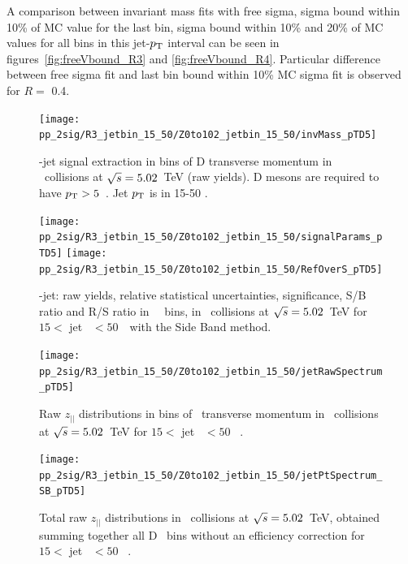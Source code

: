 A comparison between invariant mass fits with free sigma, sigma bound within 10\% of MC value for the last bin, 
sigma bound within 10\% and 20\% of MC values for all bins in this jet-$p_{\text T}$ interval can be seen in 
figures~\ref{fig:freeVbound_R3} and \ref{fig:freeVbound_R4}. Particular difference between free sigma fit and last bin bound within 10\% MC sigma fit is observed for $R=$ 0.4.

\begin{figure}[bth]
\centering
\begin{minipage}{.65\textwidth}
  \centering
  \texttt{[image: pp\_2sig/R3\_jetbin\_15\_50/Z0to102\_jetbin\_15\_50/invMass\_pTD5]}
\caption{\Dzero-jet signal extraction in bins of D transverse momentum in \pp\ collisions at $\sqrt{s}=5.02$~TeV (raw yields). D mesons are required to have $p_{\rm T}>5$~\GeVc. Jet $p_{\rm T}$ is in 15-50 \GeVc.
}
\label{fig:eq_pp_InvMass_Dzero_15_50_R3}
\end{minipage}%
\begin{minipage}{.4\textwidth}
  \centering
  \texttt{[image: pp\_2sig/R3\_jetbin\_15\_50/Z0to102\_jetbin\_15\_50/signalParams\_pTD5]}
  \texttt{[image: pp\_2sig/R3\_jetbin\_15\_50/Z0to102\_jetbin\_15\_50/RefOverS\_pTD5]}
\caption{%
\Dzero-jet: raw yields, relative statistical uncertainties, significance, S/B ratio and R/S ratio in \Dzero\ \pt\ bins, in \pp\ collisions at $\sqrt{s}=5.02$~TeV for $15<$ jet \pt\ $<50$~\GeVc\ with the Side Band method.
}
\label{fig:eq_pp_signalParams_15_50_R3}
\end{minipage}
\end{figure}
\begin{figure}[bth]
\centering
\begin{minipage}{.65\textwidth}
  \centering
\texttt{[image: pp\_2sig/R3\_jetbin\_15\_50/Z0to102\_jetbin\_15\_50/jetRawSpectrum\_pTD5]}
\caption{Raw $z_{||}$ distributions in bins of \Dzero\ transverse momentum in \pp\ collisions at $\sqrt{s}=5.02$~TeV for $15<$ jet \pt\ $<50$ \GeVc\ .}
\label{fig:eq_pp_signBkgJet_Dzero_15_50_R3}
\end{minipage}%
\begin{minipage}{.4\textwidth}
  \centering
\texttt{[image: pp\_2sig/R3\_jetbin\_15\_50/Z0to102\_jetbin\_15\_50/jetPtSpectrum\_SB\_pTD5]}
\caption{Total raw $z_{||}$ distributions in \pp\ collisions at $\sqrt{s}=5.02$~TeV, obtained summing together all D \pt\ bins without an efficiency correction for $15<$ jet \pt\ $<50$ \GeVc\ .
}
\label{fig:eq_pp_signBkgJet_tot_15_50_R3}
\end{minipage}
\end{figure}

